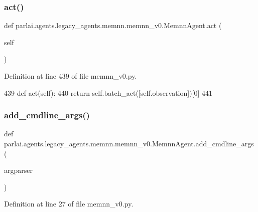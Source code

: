 \subsubsection{\texorpdfstring{act()}{act()}}
{\footnotesize\ttfamily def parlai.\+agents.\+legacy\+\_\+agents.\+memnn.\+memnn\+\_\+v0.\+Memnn\+Agent.\+act (\begin{DoxyParamCaption}\item[{}]{self }\end{DoxyParamCaption})}



Definition at line 439 of file memnn\+\_\+v0.\+py.


\begin{DoxyCode}
439     \textcolor{keyword}{def }act(self):
440         \textcolor{keywordflow}{return} self.batch\_act([self.observation])[0]
441 
\end{DoxyCode}
\mbox{\label{classparlai_1_1agents_1_1legacy__agents_1_1memnn_1_1memnn__v0_1_1MemnnAgent_a3ca2bd7b5cbce5ebac978deeb2ce9e10}} 
\subsubsection{\texorpdfstring{add\+\_\+cmdline\+\_\+args()}{add\_cmdline\_args()}}
{\footnotesize\ttfamily def parlai.\+agents.\+legacy\+\_\+agents.\+memnn.\+memnn\+\_\+v0.\+Memnn\+Agent.\+add\+\_\+cmdline\+\_\+args (\begin{DoxyParamCaption}\item[{}]{argparser }\end{DoxyParamCaption})\hspace{0.3cm}{\ttfamily [static]}}



Definition at line 27 of file memnn\+\_\+v0.\+py.


